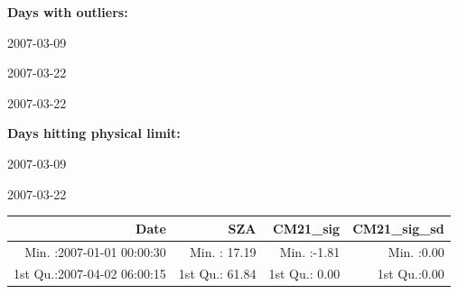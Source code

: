 \documentclass[
  10pt,
  a4paper,oneside]{article}
\begin{document}
\normalsize

\textbf{Days with outliers:}

2007-03-09

2007-03-22

2007-03-22

\textbf{Days hitting physical limit:}

2007-03-09

2007-03-22

\footnotesize

\begin{longtable}[]{@{}rrrr@{}}
\toprule
\begin{minipage}[b]{0.34\columnwidth}\raggedleft
Date\strut
\end{minipage} & \begin{minipage}[b]{0.19\columnwidth}\raggedleft
SZA\strut
\end{minipage} & \begin{minipage}[b]{0.18\columnwidth}\raggedleft
CM21\_sig\strut
\end{minipage} & \begin{minipage}[b]{0.18\columnwidth}\raggedleft
CM21\_sig\_sd\strut
\end{minipage}\tabularnewline
\midrule
\endhead
\begin{minipage}[t]{0.34\columnwidth}\raggedleft
Min. :2007-01-01 00:00:30\strut
\end{minipage} & \begin{minipage}[t]{0.19\columnwidth}\raggedleft
Min. : 17.19\strut
\end{minipage} & \begin{minipage}[t]{0.18\columnwidth}\raggedleft
Min. :-1.81\strut
\end{minipage} & \begin{minipage}[t]{0.18\columnwidth}\raggedleft
Min. :0.00\strut
\end{minipage}\tabularnewline
\begin{minipage}[t]{0.34\columnwidth}\raggedleft
1st Qu.:2007-04-02 06:00:15\strut
\end{minipage} & \begin{minipage}[t]{0.19\columnwidth}\raggedleft
1st Qu.: 61.84\strut
\end{minipage} & \begin{minipage}[t]{0.18\columnwidth}\raggedleft
1st Qu.: 0.00\strut
\end{minipage} & \begin{minipage}[t]{0.18\columnwidth}\raggedleft
1st Qu.:0.00\strut
\end{minipage}\tabularnewline

\end{longtable}
\end{document}
